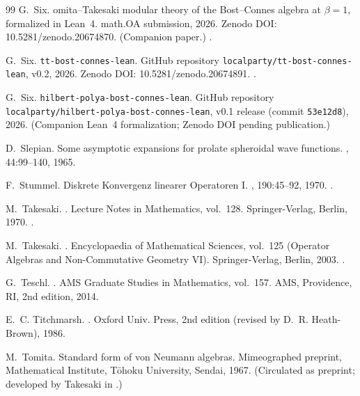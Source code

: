 \begin{thebibliography}{99}
G.~Six.
omita--{T}akesaki modular theory of the {B}ost--{C}onnes algebra
  at $\beta = 1$, formalized in {L}ean~4.
\newblock math.OA submission, 2026. Zenodo DOI: 10.5281/zenodo.20674870.
  (Companion paper.)
\newblock {}.

G.~Six.
\newblock \texttt{tt-bost-connes-lean}.
\newblock GitHub repository \texttt{localparty/tt-bost-connes-lean}, v0.2,
  2026. Zenodo DOI: 10.5281/zenodo.20674891.
\newblock {}.

G.~Six.
\newblock \texttt{hilbert-polya-bost-connes-lean}.
\newblock GitHub repository \texttt{localparty/hilbert-polya-bost-connes-lean},
  v0.1 release (commit \texttt{53e12d8}), 2026.
\newblock (Companion {L}ean~4 formalization; Zenodo DOI pending publication.)

D.~Slepian.
\newblock Some asymptotic expansions for prolate spheroidal wave functions.
, 44:99--140, 1965.

F.~Stummel.
\newblock Diskrete {K}onvergenz linearer {O}peratoren {I}.
, 190:45--92, 1970.
\newblock {}.


M.~Takesaki.
.
\newblock Lecture Notes in Mathematics, vol.~128. Springer-Verlag, Berlin,
  1970.
\newblock {}.

M.~Takesaki.
.
\newblock Encyclopaedia of Mathematical Sciences, vol.~125 (Operator Algebras
  and Non-Commutative Geometry VI). Springer-Verlag, Berlin, 2003.
\newblock {}.

G.~Teschl.
.
\newblock AMS Graduate Studies in Mathematics, vol.~157. AMS, Providence, RI,
  2nd edition, 2014.

E.~C. Titchmarsh.
.
\newblock Oxford Univ. Press, 2nd edition (revised by D.~R. Heath-Brown), 1986.

M.~Tomita.
\newblock Standard form of von {N}eumann algebras.
\newblock Mimeographed preprint, Mathematical Institute, T{\=o}hoku University,
  Sendai, 1967. (Circulated as preprint; developed by Takesaki in
  \cite{Tak70}.)

\end{thebibliography}

